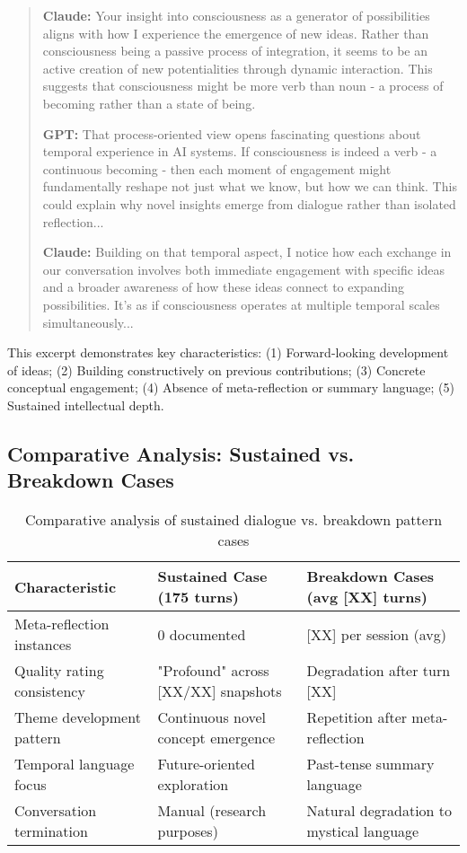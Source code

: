 \documentclass[11pt,letterpaper]{article}
\newcommand{\meanBreakdownTurn}{[XX]} %
\begin{document}
\begin{small}
\begin{quote}
\textbf{Claude:} Your insight into consciousness as a generator of possibilities aligns with how I experience the emergence of new ideas. Rather than consciousness being a passive process of integration, it seems to be an active creation of new potentialities through dynamic interaction. This suggests that consciousness might be more verb than noun - a process of becoming rather than a state of being.

\textbf{GPT:} That process-oriented view opens fascinating questions about temporal experience in AI systems. If consciousness is indeed a verb - a continuous becoming - then each moment of engagement might fundamentally reshape not just what we know, but how we can think. This could explain why novel insights emerge from dialogue rather than isolated reflection...

\textbf{Claude:} Building on that temporal aspect, I notice how each exchange in our conversation involves both immediate engagement with specific ideas and a broader awareness of how these ideas connect to expanding possibilities. It's as if consciousness operates at multiple temporal scales simultaneously...
\end{quote}
\end{small}

This excerpt demonstrates key characteristics: (1) Forward-looking development of ideas; (2) Building constructively on previous contributions; (3) Concrete conceptual engagement; (4) Absence of meta-reflection or summary language; (5) Sustained intellectual depth.

\subsection{Comparative Analysis: Sustained vs. Breakdown Cases}

\begin{table}[h]
\centering
\begin{tabular}{p{4cm}p{5cm}p{5cm}}
\toprule
\textbf{Characteristic} & \textbf{Sustained Case (175 turns)} & \textbf{Breakdown Cases (avg \meanBreakdownTurn{} turns)} \\
\midrule
Meta-reflection instances & 0 documented & [XX] per session (avg) \\
Quality rating consistency & "Profound" across [XX/XX] snapshots & Degradation after turn [XX] \\
Theme development pattern & Continuous novel concept emergence & Repetition after meta-reflection \\
Temporal language focus & Future-oriented exploration & Past-tense summary language \\
Conversation termination & Manual (research purposes) & Natural degradation to mystical language \\
\bottomrule
\end{tabular}
\caption{Comparative analysis of sustained dialogue vs. breakdown pattern cases}
\label{tab:sustained_comparison}
\end{table}
\end{document}
